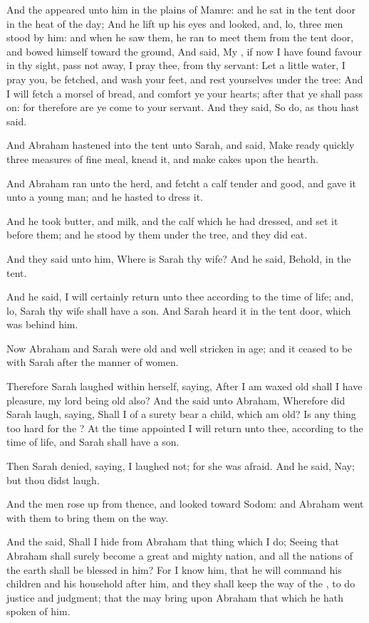 \verse And the \LORD appeared unto him in the plains of Mamre: and he sat in the tent door in the heat of the day; \verse And he lift up his eyes and looked, and, lo, three men stood by him: and when he saw them, he ran to meet them from the tent door, and bowed himself toward the ground, \verse And said, My \LORD, if now I have found favour in thy sight, pass not away, I pray thee, from thy servant: \verse Let a little water, I pray you, be fetched, and wash your feet, and rest yourselves under the tree: \verse And I will fetch a morsel of bread, and comfort ye your hearts; after that ye shall pass on: for therefore are ye come to your servant. And they said, So do, as thou hast said.

\verse And Abraham hastened into the tent unto Sarah, and said, Make ready quickly three measures of fine meal, knead it, and make cakes upon the hearth.

\verse And Abraham ran unto the herd, and fetcht a calf tender and good, and gave it unto a young man; and he hasted to dress it.

\verse And he took butter, and milk, and the calf which he had dressed, and set it before them; and he stood by them under the tree, and they did eat.

\verse And they said unto him, Where is Sarah thy wife? And he said, Behold, in the tent.

\verse And he said, I will certainly return unto thee according to the time of life; and, lo, Sarah thy wife shall have a son. And Sarah heard it in the tent door, which was behind him.

\verse Now Abraham and Sarah were old and well stricken in age; and it ceased to be with Sarah after the manner of women.

\verse Therefore Sarah laughed within herself, saying, After I am waxed old shall I have pleasure, my lord being old also?  \verse And the \LORD said unto Abraham, Wherefore did Sarah laugh, saying, Shall I of a surety bear a child, which am old?  \verse Is any thing too hard for the \LORD? At the time appointed I will return unto thee, according to the time of life, and Sarah shall have a son.

\verse Then Sarah denied, saying, I laughed not; for she was afraid.  And he said, Nay; but thou didst laugh.

\verse And the men rose up from thence, and looked toward Sodom: and Abraham went with them to bring them on the way.

\verse And the \LORD said, Shall I hide from Abraham that thing which I do; \verse Seeing that Abraham shall surely become a great and mighty nation, and all the nations of the earth shall be blessed in him?  \verse For I know him, that he will command his children and his household after him, and they shall keep the way of the \LORD, to do justice and judgment; that the \LORD may bring upon Abraham that which he hath spoken of him.

